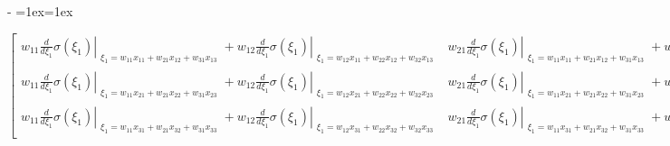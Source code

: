 \documentclass[letterpaper,10pt,english]{sphinxmanual}
\makeatletter
\newenvironment{nbsphinxfancyoutput}{%
    \let\sphinxincludegraphics\nbsphinxincludegraphics
    \nbsphinx@image@maxheight\textheight
    \advance\nbsphinx@image@maxheight -2\fboxsep   %
    \advance\nbsphinx@image@maxheight -2\fboxrule  %
    \advance\nbsphinx@image@maxheight -\baselineskip
\def\nbsphinxfcolorbox{\spx@fcolorbox{nbsphinx-code-border}{white}}%
\def\FrameCommand{\nbsphinxfcolorbox\nbsphinxfancyaddprompt\@empty}%
\def\FirstFrameCommand{\nbsphinxfcolorbox\nbsphinxfancyaddprompt\sphinxVerbatim@Continues}%
\def\MidFrameCommand{\nbsphinxfcolorbox\sphinxVerbatim@Continued\sphinxVerbatim@Continues}%
\def\LastFrameCommand{\nbsphinxfcolorbox\sphinxVerbatim@Continued\@empty}%
\MakeFramed{\advance\hsize-\width\@totalleftmargin\z@\linewidth\hsize\@setminipage}%
\lineskip=1ex\lineskiplimit=1ex\raggedright%
}{\par\unskip\@minipagefalse\endMakeFramed}
\def\nbsphinxfancyaddprompt{\ifvoid\nbsphinxpromptbox\else
    \kern\fboxrule\kern\fboxsep
    \copy\nbsphinxpromptbox
    \kern-\ht\nbsphinxpromptbox\kern-\dp\nbsphinxpromptbox
    \kern-\fboxsep\kern-\fboxrule\nointerlineskip
    \fi}
\newcommand*{\nbsphinxincludegraphics}[2][]{%
    \gdef\spx@includegraphics@options{#1}%
    \setbox\spx@image@box\hbox{\texttt{[image: \#2]}}%
    \in@false
    \ifdim \wd\spx@image@box>\linewidth
      \g@addto@macro\spx@includegraphics@options{,width=\linewidth}%
      \in@true
    \fi
    \ifdim \ht\spx@image@box>\nbsphinx@image@maxheight
      \g@addto@macro\spx@includegraphics@options{,height=\nbsphinx@image@maxheight}%
      \in@true
    \fi
    \ifin@
      \g@addto@macro\spx@includegraphics@options{,keepaspectratio}%
    \fi
    \setbox\spx@image@box\box\voidb@x %
    \expandafter\includegraphics\expandafter[\spx@includegraphics@options]{#2}%
}%
\makeatother
\begin{document}
\begin{nbsphinxfancyoutput}
$\displaystyle \left[\begin{matrix}w_{11} \left. \frac{d}{d \xi_{1}} \sigma{\left(\xi_{1} \right)} \right|_{\substack{ \xi_{1}=w_{11} x_{11} + w_{21} x_{12} + w_{31} x_{13} }} + w_{12} \left. \frac{d}{d \xi_{1}} \sigma{\left(\xi_{1} \right)} \right|_{\substack{ \xi_{1}=w_{12} x_{11} + w_{22} x_{12} + w_{32} x_{13} }} & w_{21} \left. \frac{d}{d \xi_{1}} \sigma{\left(\xi_{1} \right)} \right|_{\substack{ \xi_{1}=w_{11} x_{11} + w_{21} x_{12} + w_{31} x_{13} }} + w_{22} \left. \frac{d}{d \xi_{1}} \sigma{\left(\xi_{1} \right)} \right|_{\substack{ \xi_{1}=w_{12} x_{11} + w_{22} x_{12} + w_{32} x_{13} }} & w_{31} \left. \frac{d}{d \xi_{1}} \sigma{\left(\xi_{1} \right)} \right|_{\substack{ \xi_{1}=w_{11} x_{11} + w_{21} x_{12} + w_{31} x_{13} }} + w_{32} \left. \frac{d}{d \xi_{1}} \sigma{\left(\xi_{1} \right)} \right|_{\substack{ \xi_{1}=w_{12} x_{11} + w_{22} x_{12} + w_{32} x_{13} }}\\w_{11} \left. \frac{d}{d \xi_{1}} \sigma{\left(\xi_{1} \right)} \right|_{\substack{ \xi_{1}=w_{11} x_{21} + w_{21} x_{22} + w_{31} x_{23} }} + w_{12} \left. \frac{d}{d \xi_{1}} \sigma{\left(\xi_{1} \right)} \right|_{\substack{ \xi_{1}=w_{12} x_{21} + w_{22} x_{22} + w_{32} x_{23} }} & w_{21} \left. \frac{d}{d \xi_{1}} \sigma{\left(\xi_{1} \right)} \right|_{\substack{ \xi_{1}=w_{11} x_{21} + w_{21} x_{22} + w_{31} x_{23} }} + w_{22} \left. \frac{d}{d \xi_{1}} \sigma{\left(\xi_{1} \right)} \right|_{\substack{ \xi_{1}=w_{12} x_{21} + w_{22} x_{22} + w_{32} x_{23} }} & w_{31} \left. \frac{d}{d \xi_{1}} \sigma{\left(\xi_{1} \right)} \right|_{\substack{ \xi_{1}=w_{11} x_{21} + w_{21} x_{22} + w_{31} x_{23} }} + w_{32} \left. \frac{d}{d \xi_{1}} \sigma{\left(\xi_{1} \right)} \right|_{\substack{ \xi_{1}=w_{12} x_{21} + w_{22} x_{22} + w_{32} x_{23} }}\\w_{11} \left. \frac{d}{d \xi_{1}} \sigma{\left(\xi_{1} \right)} \right|_{\substack{ \xi_{1}=w_{11} x_{31} + w_{21} x_{32} + w_{31} x_{33} }} + w_{12} \left. \frac{d}{d \xi_{1}} \sigma{\left(\xi_{1} \right)} \right|_{\substack{ \xi_{1}=w_{12} x_{31} + w_{22} x_{32} + w_{32} x_{33} }} & w_{21} \left. \frac{d}{d \xi_{1}} \sigma{\left(\xi_{1} \right)} \right|_{\substack{ \xi_{1}=w_{11} x_{31} + w_{21} x_{32} + w_{31} x_{33} }} + w_{22} \left. \frac{d}{d \xi_{1}} \sigma{\left(\xi_{1} \right)} \right|_{\substack{ \xi_{1}=w_{12} x_{31} + w_{22} x_{32} + w_{32} x_{33} }} & w_{31} \left. \frac{d}{d \xi_{1}} \sigma{\left(\xi_{1} \right)} \right|_{\substack{ \xi_{1}=w_{11} x_{31} + w_{21} x_{32} + w_{31} x_{33} }} + w_{32} \left. \frac{d}{d \xi_{1}} \sigma{\left(\xi_{1} \right)} \right|_{\substack{ \xi_{1}=w_{12} x_{31} + w_{22} x_{32} + w_{32} x_{33} }}\end{matrix}\right]$
\end{nbsphinxfancyoutput}
\end{document}
